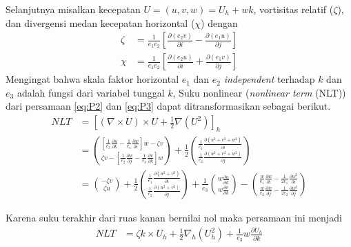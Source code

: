 \begin{spacing}{1.5}
	Selanjutnya misalkan kecepatan $U=(u,v,w)=U_h+wk$, vortisitas relatif ($\zeta$), dan divergensi medan kecepatan horizontal ($\chi$) dengan
	\begin{equation}
		\begin{aligned}
			\zeta &= \frac{1}{e_1e_2}\left[\frac{\partial (e_2v)}{\partial i}-\frac{\partial (e_1u)}{\partial j}\right]\\
			\chi &= \frac{1}{e_1e_2}\left[\frac{\partial (e_2u)}{\partial i}+\frac{\partial (e_1v)}{\partial j}\right]
		\end{aligned}
	\label{eq:divhor}
	\end{equation}
	Mengingat bahwa skala faktor horizontal $e_1$ dan $e_2$ \textit{independent} terhadap $k$ dan $e_3$ adalah fungsi dari variabel tunggal $k$, Suku nonlinear (\textit{nonlinear term} (NLT)) dari persamaan \ref{eq:P2} dan \ref{eq:P3} dapat ditransformasikan sebagai berikut.
	\begin{equation*}
		\begin{aligned}
			NLT &= \left[(\nabla \times U)\times U+\frac{1}{2}\nabla(U^2)\right]_h \\
			 &= \binom{\left[\frac{1}{e_3}\frac{\partial u}{\partial k}-\frac{1}{e_1}\frac{\partial w}{\partial i}\right]w-\zeta v}{\zeta v-\left[\frac{1}{e_2}\frac{\partial w}{\partial j}-\frac{1}{e_3}\frac{\partial v}{\partial k}\right]w}+\frac{1}{2}\binom{\frac{1}{e_1}\frac{\partial (u^2+v^2+w^2)}{\partial i}}{\frac{1}{e_2}\frac{\partial (u^2+v^2+w^2)}{\partial j}}\\
			 &=\binom{-\zeta v}{\zeta u}+\frac{1}{2}\binom{\frac{1}{e_1}\frac{\partial (u^2+v^2)}{\partial i}}{\frac{1}{e_2}\frac{\partial (u^2+v^2)}{\partial j}}+\frac{1}{e_3}\binom{w\frac{\partial u}{\partial k}}{w\frac{\partial v}{\partial k}}-\binom{\frac{w}{e_1}\frac{\partial w}{\partial i}-\frac{1}{2e_1}\frac{\partial w^2}{\partial i}}{\frac{w}{e_2}\frac{\partial w}{\partial j}-\frac{1}{2e_2}\frac{\partial w^2}{\partial j}}
		\end{aligned}
	\end{equation*}
	
	Karena suku terakhir dari ruas kanan bernilai nol maka persamaan ini menjadi
	\begin{equation}
		\begin{aligned}
			NLT &= \zeta k \times U_h + \frac{1}{2}\nabla_h (U^2_h) + \frac{1}{e_3}w\frac{\partial U_h}{\partial k}
		\end{aligned}
		\label{eq:flux_1}
	\end{equation}
	

\end{spacing}

